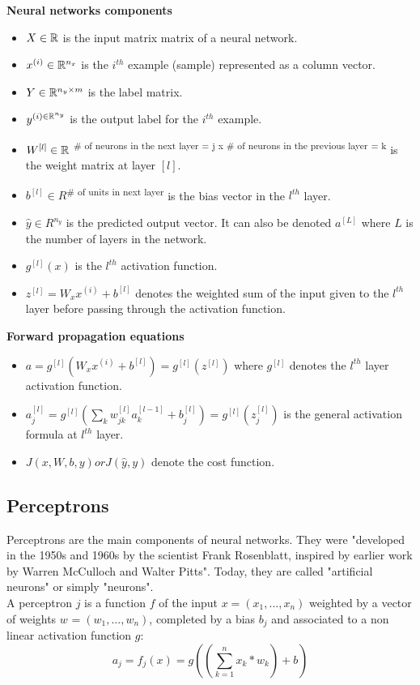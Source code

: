 \noindent \textbf{Neural networks components}
\begin{itemize}
\item $X\in \mathbb{R}$ is the input matrix matrix of a neural network.
\item $x^{(i)} \in \mathbb{R}^{n_{x}}$ is the $i^{th}$ example (sample) represented as a column vector.
\item $Y \in \mathbb{R}^{n_{y} \times m}$ is the label matrix.
\item $y^{(i) \in \mathbb{R}^{n_{y}}}$ is the output label for the $i^{th}$ example.
\item $W^{[l]} \in \mathbb{R}$ \textsuperscript{\# of neurons in the next layer = j  x \# of neurons in the previous layer = k} is the weight matrix at layer $[l]$.
\item $b^{[l]} \in R$\textsuperscript{\# of units in next layer} is the bias vector in the $l^{th}$ layer.
\item $\hat{y} \in R^{n_{y}}$ is the predicted output vector. It can also be denoted $a^{[L]}$ where $L$ is the number of layers in the network.
\item $g^{[l]}(x)$ is the $l^{th}$ activation function.  
\item $z^{[l]} = W_{x}x^{(i)} + b^{[l]}$ denotes the weighted sum of the input given to the $l^{th}$ layer before passing through the activation function.\\
\end{itemize}

\noindent \textbf{Forward propagation equations}
\begin{itemize}
\item $a = g^{[l]}(W_{x}x^{(i)} + b^{[l]}) = g^{[l]}(z^{[l]})$ where $g^{[l]}$ denotes the $l^{th}$ layer activation function.
\item $a_{j}^{[l]} = g^{[l]} (\sum_{k} w_{jk}^{[l]}a_{k}^{[l-1]} + b_{j}^{[l]}) = g^{[l]} (z_{j}^{[l]}) $ is the general activation formula at $l^{th}$ layer.
\item $J(x, W, b, y) or J(\hat{y}, y)$ denote the cost function.
\end{itemize}

\subsection{Perceptrons}
\label{perceptron}
Perceptrons are the main components of neural networks. They were "developed in the 1950s and 1960s by the scientist Frank Rosenblatt, inspired by earlier work by Warren McCulloch and Walter Pitts"\cite{13}. Today, they are called "artificial neurons" or simply "neurons".\\
A perceptron $j$ is a function $f$ of the input $x=(x_{1}, ..., x_{n})$ weighted by a vector of weights $w_{}=(w_{1}, ..., w_{n})$, completed by a bias $b_{j}$ and associated to a non linear activation function $g$:
\begin{equation}
\label{perceptron_equation}
a_{j} = f_{j}(x) = g((\sum_{k=1}^{n} x_{k} * w_{k}) + b_{})
\end{equation}

